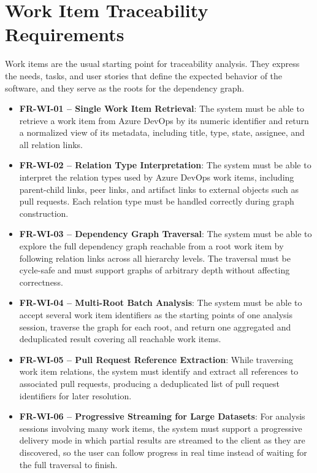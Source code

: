\section{Work Item Traceability Requirements}
\label{sec:req-work-items}

Work items are the usual starting point for traceability analysis. They express
the needs, tasks, and user stories that define the expected behavior of the
software, and they serve as the roots for the dependency graph.

\begin{itemize}
  \item \textbf{FR-WI-01 -- Single Work Item Retrieval}: The system must be able to retrieve a work item from Azure DevOps by its numeric identifier and return a normalized view of its metadata, including title, type, state, assignee, and all relation links.

  \item \textbf{FR-WI-02 -- Relation Type Interpretation}: The system must be able to interpret the relation types used by Azure DevOps work items, including parent-child links, peer links, and artifact links to external objects such as pull requests. Each relation type must be handled correctly during graph construction.

  \item \textbf{FR-WI-03 -- Dependency Graph Traversal}: The system must be able to explore the full dependency graph reachable from a root work item by following relation links across all hierarchy levels. The traversal must be cycle-safe and must support graphs of arbitrary depth without affecting correctness.

  \item \textbf{FR-WI-04 -- Multi-Root Batch Analysis}: The system must be able to accept several work item identifiers as the starting points of one analysis session, traverse the graph for each root, and return one aggregated and deduplicated result covering all reachable work items.

  \item \textbf{FR-WI-05 -- Pull Request Reference Extraction}: While traversing work item relations, the system must identify and extract all references to associated pull requests, producing a deduplicated list of pull request identifiers for later resolution.

  \item \textbf{FR-WI-06 -- Progressive Streaming for Large Datasets}: For analysis sessions involving many work items, the system must support a progressive delivery mode in which partial results are streamed to the client as they are discovered, so the user can follow progress in real time instead of waiting for the full traversal to finish.
\end{itemize}

